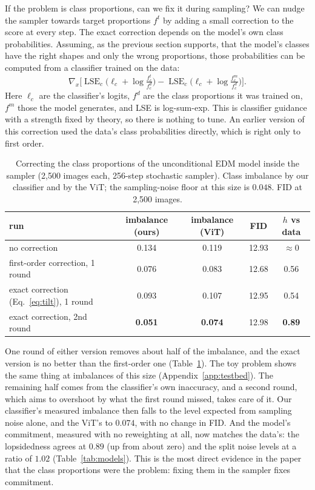 \documentclass[11pt]{article}
\begin{document}
If the problem is class proportions, can we fix it during sampling? We can nudge the sampler towards target proportions $f^t$ by adding a small correction to the score at every step. The exact correction depends on the model's own class probabilities. Assuming, as the previous section supports, that the model's classes have the right shapes and only the wrong proportions, those probabilities can be computed from a classifier trained on the data:
\begin{equation}
\nabla_x\Big[\operatorname{LSE}_c\big(\ell_c+\log\tfrac{f^t_c}{f^d_c}\big)-\operatorname{LSE}_c\big(\ell_c+\log\tfrac{f^m_c}{f^d_c}\big)\Big].
\label{eq:tilt}
\end{equation}
Here $\ell_c$ are the classifier's logits, $f^d$ are the class proportions it was trained on, $f^m$ those the model generates, and LSE is log-sum-exp. This is classifier guidance with a strength fixed by theory, so there is nothing to tune. An earlier version of this correction used the data's class probabilities directly, which is right only to first order.

\begin{table}[t]
\centering
\caption{Correcting the class proportions of the unconditional EDM model inside the sampler (2{,}500 images each, 256-step stochastic sampler). Class imbalance by our classifier and by the ViT; the sampling-noise floor at this size is $0.048$. FID at 2{,}500 images.}
\label{tab:correct}
\small
\begin{tabular}{lcccc}
\toprule
run & imbalance (ours) & imbalance (ViT) & FID & $h$ vs data \\
\midrule
no correction & 0.134 & 0.119 & 12.93 & $\approx0$ \\
first-order correction, 1 round & 0.076 & 0.083 & 12.68 & 0.56 \\
exact correction (Eq.~\ref{eq:tilt}), 1 round & 0.093 & 0.107 & 12.95 & 0.54 \\
exact correction, 2nd round & \textbf{0.051} & \textbf{0.074} & 12.98 & \textbf{0.89} \\
\bottomrule
\end{tabular}
\end{table}

One round of either version removes about half of the imbalance, and the exact version is no better than the first-order one (Table~\ref{tab:correct}). The toy problem shows the same thing at imbalances of this size (Appendix~\ref{app:testbed}). The remaining half comes from the classifier's own inaccuracy, and a second round, which aims to overshoot by what the first round missed, takes care of it. Our classifier's measured imbalance then falls to the level expected from sampling noise alone, and the ViT's to $0.074$, with no change in FID. And the model's commitment, measured with no reweighting at all, now matches the data's: the lopsidedness agrees at $0.89$ (up from about zero) and the split noise levels at a ratio of $1.02$ (Table~\ref{tab:models}). This is the most direct evidence in the paper that the class proportions were the problem: fixing them in the sampler fixes commitment.
\end{document}
